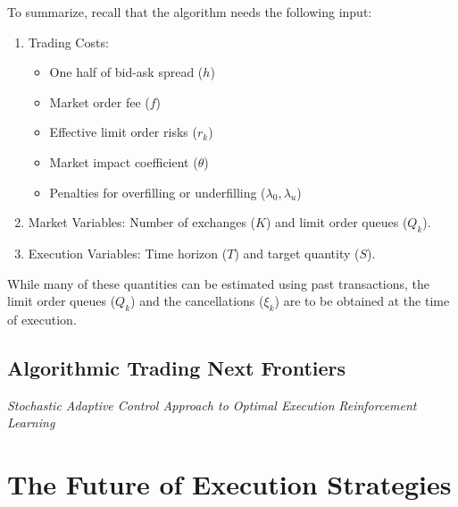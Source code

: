 To summarize, recall that the algorithm needs the following input:
	\begin{enumerate}[--]
	\item Trading Costs: 
		\begin{itemize}
		\item One half of bid-ask spread ($h$)
		\item Market order fee ($f$)
		\item Effective limit order risks ($r_k$)
		\item Market impact coefficient ($\theta$)
		\item Penalties for overfilling or underfilling ($\lambda_0,\lambda_u$)
		\end{itemize}
	\item Market Variables: Number of exchanges ($K$) and limit order queues ($Q_k$).
	\item Execution Variables: Time horizon ($T$) and target quantity ($S$).
	\end{enumerate}
While many of these quantities can be estimated using past transactions, the limit order queues ($Q_k$) and the cancellations ($\xi_k$) are to be obtained at the time of execution.



\subsection{Algorithmic Trading Next Frontiers}
\noindent\emph{ Stochastic Adaptive Control Approach to Optimal Execution}
\noindent\emph{Reinforcement Learning}
\section{The Future of Execution Strategies}